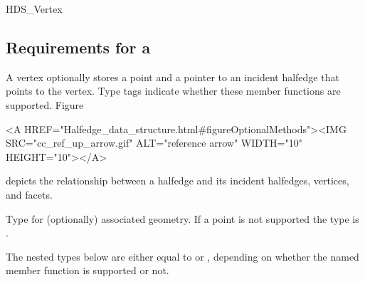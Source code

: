 \begin{ccClass}{HDS_Vertex}
\subsection{Requirements for a \protect{}}
\label{sectionHdsVertex}


\ccDefinition

A vertex optionally stores a point and a pointer to an incident
halfedge that points to the vertex.  Type tags indicate whether these
member functions are supported.  
Figure~\ccTexHtml{\ref{figureOptionalMethods}}{}\begin{ccHtmlOnly}
  <A HREF="Halfedge_data_structure.html#figureOptionalMethods"><IMG 
  SRC="cc_ref_up_arrow.gif" ALT="reference arrow" WIDTH="10" HEIGHT="10"></A>
\end{ccHtmlOnly}
depicts the relationship between a halfedge and its incident halfedges,
vertices, and facets.

\ccThreeToTwo

\ccTypes

\ccGlue
{}
\ccGlue
{}

Type for (optionally) associated geometry. If a
point is not supported the type is .



\ccOperations

\ccGlue
{}
\ccGlue
{}
\ccGlue
{}




The nested types below are either equal to  or
, depending on whether the named member function is
supported or not. 

\ccGlue
{}

\end{ccClass}



